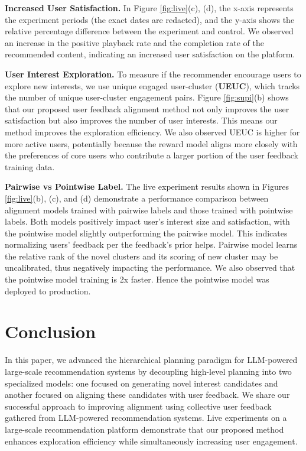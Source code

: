\documentclass[11pt]{article}
\begin{document}
\smallskip
\noindent\textbf{Increased User Satisfaction.} In Figure \ref{fig:live}(c), (d), the x-axis represents the experiment periods (the exact dates are redacted), and the y-axis shows the relative percentage difference between the experiment and control.  We observed an increase in the positive playback rate and the completion rate of the recommended content, indicating an increased user satisfaction on the platform. %

\smallskip
\noindent\textbf{User Interest Exploration.} To measure if the recommender encourage users to explore new interests, we use unique engaged user-cluster (\textbf{UEUC}), which tracks the number of unique user-cluster engagement pairs. Figure \ref{fig:supi}(b) shows that our proposed user feedback alignment method not only improves the user satisfaction but also improves the number of user interests. This means our method improves the exploration efficiency. We also observed UEUC is higher for more active users, potentially because the reward model aligns more closely with the preferences of core users who contribute a larger portion of the user feedback training data.


\smallskip
\noindent\textbf{Pairwise vs Pointwise Label.} The live experiment results shown in Figures \ref{fig:live}(b), (c), and (d) demonstrate a performance comparison between alignment models trained with pairwise labels and those trained with pointwise labels. Both models positively impact user's interest size and satisfaction, with the pointwise model slightly outperforming the pairwise model. This indicates normalizing users' feedback per the feedback's prior helps. Pairwise model learns the relative rank of the novel clusters and its scoring of new cluster may be uncalibrated, thus negatively impacting the performance. We also observed that the pointwise model training is 2x faster. Hence the pointwise model was deployed to production. 



\section{Conclusion}
In this paper, we advanced the hierarchical planning paradigm for LLM-powered large-scale recommendation systems by decoupling high-level planning into two specialized models: one focused on generating novel interest candidates and another focused on aligning these candidates with user feedback. We share our successful approach to improving alignment using collective user feedback gathered from LLM-powered recommendation systems.  Live experiments on a large-scale recommendation platform demonstrate that our proposed method enhances exploration efficiency while simultaneously increasing user engagement.
\end{document}
